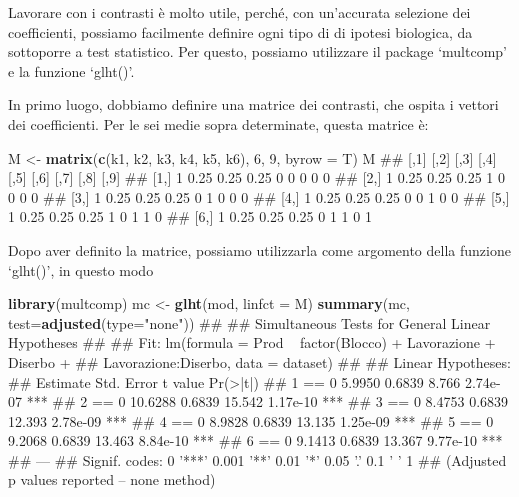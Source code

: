 \documentclass[a4paper,12pt,oneside]{book}
\newenvironment{Shaded}{\begin{snugshade}}{\end{snugshade}}
\newcommand{\KeywordTok}[1]{\textcolor[rgb]{0.13,0.29,0.53}{\textbf{#1}}}
\newcommand{\DataTypeTok}[1]{\textcolor[rgb]{0.13,0.29,0.53}{#1}}
\newcommand{\DecValTok}[1]{\textcolor[rgb]{0.00,0.00,0.81}{#1}}
\newcommand{\StringTok}[1]{\textcolor[rgb]{0.31,0.60,0.02}{#1}}
\newcommand{\NormalTok}[1]{#1}
\theoremstyle{definition}
\theoremstyle{definition}
\theoremstyle{definition}
\theoremstyle{remark}
\begin{document}
Lavorare con i contrasti è molto utile, perché, con un'accurata
selezione dei coefficienti, possiamo facilmente definire ogni tipo di di
ipotesi biologica, da sottoporre a test statistico. Per questo, possiamo
utilizzare il package `multcomp' e la funzione `glht()'.

In primo luogo, dobbiamo definire una matrice dei contrasti, che ospita
i vettori dei coefficienti. Per le sei medie sopra determinate, questa
matrice è:

\begin{Shaded}
\begin{Highlighting}[]
\NormalTok{M <-}\StringTok{ }\KeywordTok{matrix}\NormalTok{(}\KeywordTok{c}\NormalTok{(k1, k2, k3, k4, k5, k6), }\DecValTok{6}\NormalTok{, }\DecValTok{9}\NormalTok{, }\DataTypeTok{byrow =}\NormalTok{ T)}
\NormalTok{M}
\NormalTok{##      [,1] [,2] [,3] [,4] [,5] [,6] [,7] [,8] [,9]}
\NormalTok{## [1,]    1 0.25 0.25 0.25    0    0    0    0    0}
\NormalTok{## [2,]    1 0.25 0.25 0.25    1    0    0    0    0}
\NormalTok{## [3,]    1 0.25 0.25 0.25    0    1    0    0    0}
\NormalTok{## [4,]    1 0.25 0.25 0.25    0    0    1    0    0}
\NormalTok{## [5,]    1 0.25 0.25 0.25    1    0    1    1    0}
\NormalTok{## [6,]    1 0.25 0.25 0.25    0    1    1    0    1}
\end{Highlighting}
\end{Shaded}

Dopo aver definito la matrice, possiamo utilizzarla come argomento della
funzione `glht()', in questo modo

\begin{Shaded}
\begin{Highlighting}[]
\KeywordTok{library}\NormalTok{(multcomp)}
\NormalTok{mc <-}\StringTok{ }\KeywordTok{glht}\NormalTok{(mod, }\DataTypeTok{linfct =}\NormalTok{ M)}
\KeywordTok{summary}\NormalTok{(mc, }\DataTypeTok{test=}\KeywordTok{adjusted}\NormalTok{(}\DataTypeTok{type=}\StringTok{"none"}\NormalTok{))}
\NormalTok{## }
\NormalTok{##   Simultaneous Tests for General Linear Hypotheses}
\NormalTok{## }
\NormalTok{## Fit: lm(formula = Prod ~ factor(Blocco) + Lavorazione + Diserbo + }
\NormalTok{##     Lavorazione:Diserbo, data = dataset)}
\NormalTok{## }
\NormalTok{## Linear Hypotheses:}
\NormalTok{##        Estimate Std. Error t value Pr(>|t|)    }
\NormalTok{## 1 == 0   5.9950     0.6839   8.766 2.74e-07 ***}
\NormalTok{## 2 == 0  10.6288     0.6839  15.542 1.17e-10 ***}
\NormalTok{## 3 == 0   8.4753     0.6839  12.393 2.78e-09 ***}
\NormalTok{## 4 == 0   8.9828     0.6839  13.135 1.25e-09 ***}
\NormalTok{## 5 == 0   9.2068     0.6839  13.463 8.84e-10 ***}
\NormalTok{## 6 == 0   9.1413     0.6839  13.367 9.77e-10 ***}
\NormalTok{## ---}
\NormalTok{## Signif. codes:  0 '***' 0.001 '**' 0.01 '*' 0.05 '.' 0.1 ' ' 1}
\NormalTok{## (Adjusted p values reported -- none method)}
\end{Highlighting}
\end{Shaded}
\end{document}
